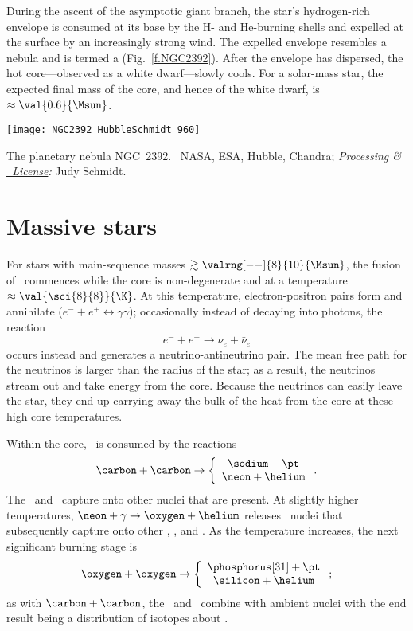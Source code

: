 During the ascent of the asymptotic giant branch, the star's hydrogen-rich envelope is consumed at its base by the H- and He-burning shells and expelled at the surface by an increasingly strong wind. The expelled envelope resembles a nebula and is termed a  (Fig.~\ref{f.NGC2392}). After the envelope has dispersed, the hot core---observed as a white dwarf---slowly cools. For a solar-mass star, the expected final mass of the core, and hence of the white dwarf, is $\approx\val{0.6}{\Msun}$.
\begin{marginfigure}
\texttt{[image: NGC2392\_HubbleSchmidt\_960]}
\caption[The planetary nebula NGC 2392]{\label{f.NGC2392} The planetary nebula NGC~2392. \imgcred\ NASA, ESA, Hubble, Chandra; \emph{Processing \& \href{https://creativecommons.org/licenses/by/2.0/}{\ccby\ License}:} Judy Schmidt.}
\end{marginfigure}

\section{Massive stars}

For stars with main-sequence masses $\gtrsim \valrng[--]{8}{10}{\Msun}$, the fusion of \carbon\ commences while the core is non-degenerate and at a temperature $\approx\val{\sci{8}{8}}{\K}$.  At this temperature, electron-positron pairs form and annihilate ($e^{-}+e^{+}\longleftrightarrow\gamma\gamma$); occasionally instead of decaying into photons, the reaction
\[ e^{-}+e^{+} \longrightarrow \nu_{e} + \bar{\nu}_{e}\]
occurs instead and generates a neutrino-antineutrino pair. The mean free path for the neutrinos is larger than the radius of the star; as a result, the neutrinos stream out and take energy from the core. Because the neutrinos can easily leave the star, they end up carrying away the bulk of the heat from the core at these high core temperatures.

Within the core, \carbon\ is consumed by the reactions
\[ \carbon+\carbon\to\left\{\begin{array}{c}\sodium+\pt \\\neon+\helium\end{array}\right.. \]
The \pt\ and \helium\ capture onto other nuclei that are present.  At slightly higher temperatures, $\neon+\gamma \to \oxygen+\helium$ releases \helium\ nuclei that subsequently capture onto other \oxygen, \neon, and \magnesium. As the temperature increases, the next significant burning stage is
\[\oxygen+\oxygen\to\left\{\begin{array}{c}\phosphorus[31]+\pt \\ \silicon+\helium \end{array}\right. ;\]
as with $\carbon+\carbon$, the \pt\ and \helium\ combine with ambient nuclei with the end result being a distribution of isotopes about \silicon.

